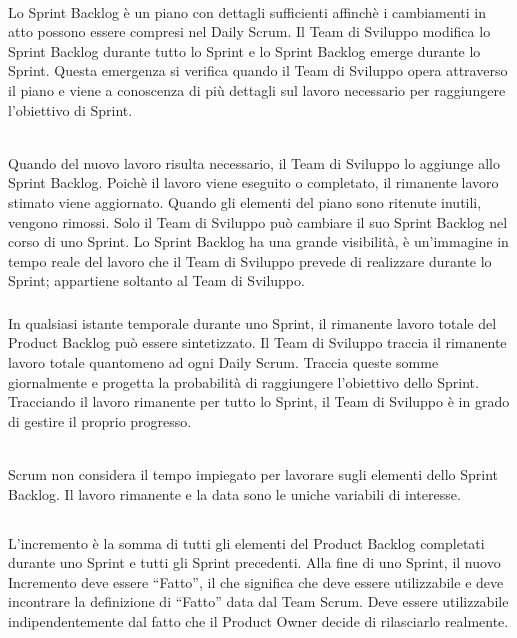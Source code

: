 \\Lo Sprint Backlog \`e un piano con dettagli sufficienti affinch\`e i cambiamenti in atto 
possono essere compresi nel Daily Scrum. Il Team di Sviluppo modifica lo Sprint Backlog 
durante tutto lo Sprint e lo Sprint Backlog emerge durante lo Sprint. Questa emergenza si 
verifica quando il Team di Sviluppo opera attraverso il piano e viene a conoscenza di 
pi\`u dettagli sul lavoro necessario per raggiungere l'obiettivo di Sprint. \newline

\\Quando del nuovo lavoro risulta necessario, il Team di Sviluppo lo aggiunge allo Sprint 
Backlog. Poich\`e il lavoro viene eseguito o completato, il rimanente lavoro stimato viene 
aggiornato. Quando gli elementi del piano sono ritenute inutili, vengono rimossi. Solo il 
Team di Sviluppo pu\`o cambiare il suo Sprint Backlog nel corso di uno Sprint. Lo Sprint 
Backlog ha una grande visibilit\`a, \`e un'immagine in tempo reale del lavoro che il Team 
di Sviluppo prevede di realizzare durante lo Sprint; appartiene soltanto al Team di Sviluppo.

\subsubsection*{\color{SteelBlue}{Monitorare i Progressi dello Sprint}} %
\label{ssub:monitoring_sprint_progress}
In qualsiasi istante temporale durante uno Sprint, il rimanente lavoro totale del Product Backlog 
pu\`o essere sintetizzato. Il Team di Sviluppo traccia il rimanente lavoro totale quantomeno 
ad ogni Daily Scrum. Traccia queste somme giornalmente e progetta la probabilit\`a di 
raggiungere l'obiettivo dello Sprint. Tracciando il lavoro rimanente per tutto lo Sprint, 
il Team di Sviluppo \`e in grado di gestire il proprio progresso. \newline

\\Scrum non considera il tempo impiegato per lavorare sugli elementi dello Sprint Backlog. 
Il lavoro rimanente e la data sono le uniche variabili di interesse. 


\subsection*{\color{SteelBlue}{Incremento}}
\label{sec:increment}
L'incremento \`e la somma di tutti gli elementi del Product Backlog completati durante uno 
Sprint e tutti gli Sprint precedenti. Alla fine di uno Sprint, il nuovo Incremento deve 
essere ``Fatto'', il che significa che deve essere utilizzabile e deve incontrare la 
definizione di ``Fatto'' data dal Team Scrum. Deve essere utilizzabile indipendentemente dal 
fatto che il Product Owner decide di rilasciarlo realmente.

